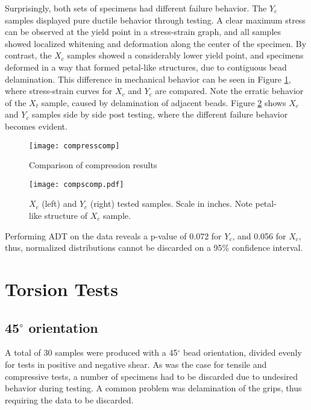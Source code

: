 \documentclass[main.tex]{subfiles}
\begin{document}
Surprisingly, both sets of specimens had different failure behavior. The $Y_c$ samples displayed pure ductile behavior through testing. A clear maximum stress can be observed at the yield point in a stress-strain graph, and all samples showed localized whitening and deformation along the center of the specimen. By contrast, the $X_c$ samples showed a considerably lower yield point, and specimens deformed in a way that formed petal-like structures, due to contiguous bead delamination. This difference in mechanical behavior can be seen in Figure \ref{fig:comprComp}, where stress-strain curves for $X_c$ and $Y_c$ are compared. Note the erratic behavior of the $X_t$ sample, caused by delamination of adjacent beads. Figure \ref{fig:CompSComp} shows $X_c$ and $Y_c$ samples side by side post testing, where the different failure behavior becomes evident. 

\begin{figure}[!htbp]
	\center
	\texttt{[image: compresscomp]}
	\caption{Comparison of compression results} \label{fig:comprComp}
\end{figure}  

\begin{figure}[!htbp]
	\center
	\texttt{[image: compscomp.pdf]}
	\captionsetup{justification=centering} %
	\caption[$X_c$ and $Y_c$ tested samples]{$X_c$ (left) and $Y_c$ (right) tested samples. Scale in inches. Note petal-like structure of $X_c$ sample.} \label{fig:CompSComp}
\end{figure}

Performing ADT on the data reveals a p-value of 0.072 for $Y_c$, and 0.056 for $X_c$, thus, normalized distributions cannot be discarded on a 95\% confidence interval. %
\section{Torsion Tests} \label{sec:torsr}
\subsection{45$^\circ$ orientation} \label{ssec:45r}
A total of 30 samples were produced with a 45$^\circ$ bead orientation, divided evenly for tests in positive and negative shear. As was the case for tensile and compressive tests, a number of specimens had to be discarded due to undesired behavior during testing. A common problem was delamination of the grips, thus requiring the data to be discarded. 
\end{document}
